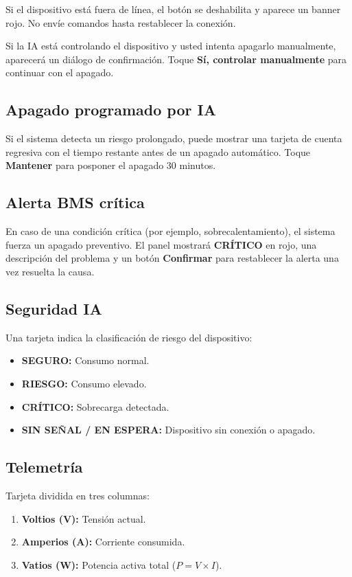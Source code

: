 \documentclass[10pt,a4paper]{article}
\begin{document}
\begin{alertBox}
Si el dispositivo está fuera de línea, el botón se deshabilita y aparece un banner rojo. No envíe comandos hasta restablecer la conexión.
\end{alertBox}

\smallskip
Si la IA está controlando el dispositivo y usted intenta apagarlo manualmente, aparecerá un diálogo de confirmación. Toque \textbf{Sí, controlar manualmente} para continuar con el apagado.

\subsection{Apagado programado por IA}
Si el sistema detecta un riesgo prolongado, puede mostrar una tarjeta de cuenta regresiva con el tiempo restante antes de un apagado automático. Toque \textbf{Mantener} para posponer el apagado 30 minutos.

\subsection{Alerta BMS crítica}
En caso de una condición crítica (por ejemplo, sobrecalentamiento), el sistema fuerza un apagado preventivo. El panel mostrará \textbf{CRÍTICO} en rojo, una descripción del problema y un botón \textbf{Confirmar} para restablecer la alerta una vez resuelta la causa.

\subsection{Seguridad IA}
Una tarjeta indica la clasificación de riesgo del dispositivo:
\begin{itemize}
    \item \textbf{SEGURO:} Consumo normal.
    \item \textbf{RIESGO:} Consumo elevado.
    \item \textbf{CRÍTICO:} Sobrecarga detectada.
    \item \textbf{SIN SEÑAL / EN ESPERA:} Dispositivo sin conexión o apagado.
\end{itemize}

\subsection{Telemetría}
Tarjeta dividida en tres columnas:
\begin{enumerate}
    \item \textbf{Voltios (V):} Tensión actual.
    \item \textbf{Amperios (A):} Corriente consumida.
    \item \textbf{Vatios (W):} Potencia activa total ($P = V \times I$).
\end{enumerate}
\end{document}
